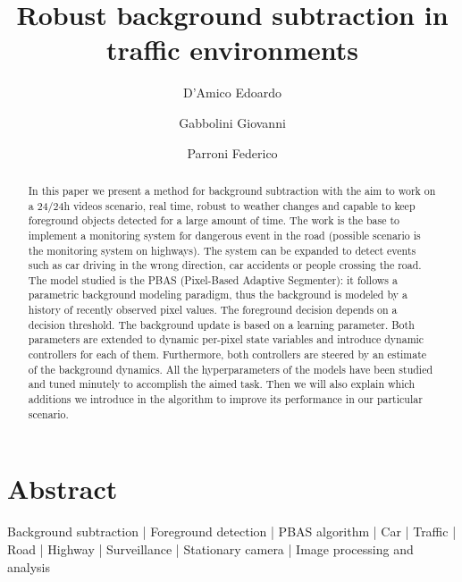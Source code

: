 
\title{Robust background subtraction in traffic environments}

\author[1 \space *]{D'Amico Edoardo}
\author[1 \space *]{Gabbolini Giovanni}
\author[1 \space *]{Parroni Federico}


\maketitle

\section*{Abstract}
\begin{abstract}
In this paper we present a method for background subtraction with the aim to work on a 24/24h videos scenario, real time, robust to weather changes and capable to keep foreground objects detected for a large amount of time. The work is the base to implement a monitoring system for dangerous event in the road (possible scenario is the monitoring system on highways). The system can be expanded to detect events such as car driving in the wrong direction, car accidents or people crossing the road.
The model studied is the PBAS (Pixel-Based Adaptive Segmenter): it follows a parametric background modeling paradigm, thus the background is modeled by a history of recently observed pixel values. The foreground decision depends on a decision threshold. The background update is based on a learning parameter. Both parameters are extended to dynamic per-pixel state variables and introduce dynamic controllers for each of them. Furthermore, both controllers are steered by an estimate of the background dynamics. All the hyperparameters of the models have been studied and tuned minutely to accomplish the aimed task. Then we will also explain which additions we introduce in the algorithm to improve its performance in our particular scenario.
\end {abstract}

\begin{keywords}
    Background subtraction | Foreground detection | PBAS algorithm | Car | Traffic | Road | Highway | Surveillance |
    Stationary camera | Image processing and analysis
\end{keywords}


